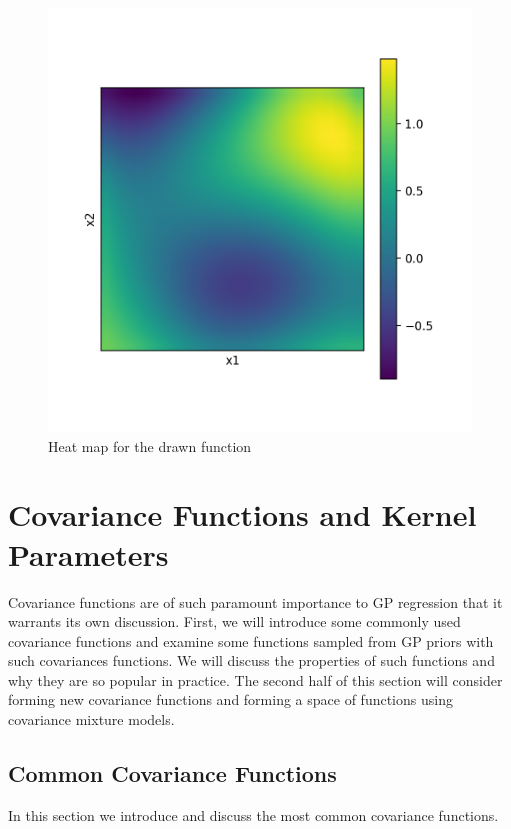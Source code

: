 \documentclass[10pt,a4paper]{article}
\numberwithin{equation}{section}
\theoremstyle{plain}
\theoremstyle{definition}
\theoremstyle{own}
\begin{document}
\begin{figure}[H]
\begin{center}
\begin{minipage}{0.49\textwidth}
\begin{center}
\includegraphics[width=1.0\textwidth]{heat_2d}
\end{center}
\caption{Heat map for the drawn function}
\label{fig:second}
\end{minipage}
\end{center}
\end{figure}
\section{Covariance Functions and Kernel Parameters}
Covariance functions are of such paramount importance to GP regression that it warrants its own discussion. First, we will introduce some commonly used covariance functions and examine some functions sampled from GP priors with such covariances functions. We will discuss the properties of such functions and why they are so popular in practice. The second half of this section will consider forming new covariance functions and forming a space of functions using covariance mixture models.
\subsection{Common Covariance Functions}
In this section we introduce and discuss the most common covariance functions.
\end{document}
